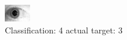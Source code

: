 \begin{figure}[h!]
\begin{center}
\includegraphics[width=0.60\columnwidth]{figures/ID1903_class_4_target_3.png}
\end{center}
\caption{ Classification: 4 actual target: 3}
\label{fig:ID1903_class_4_target_3}
\end{figure}
